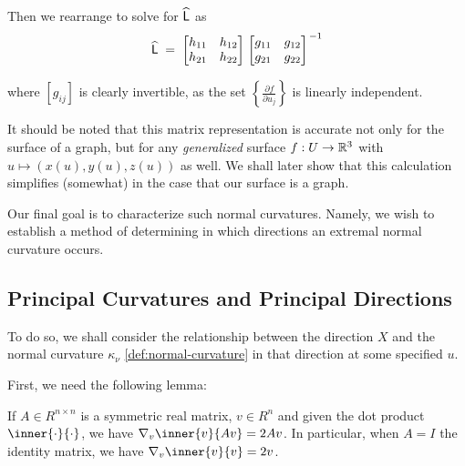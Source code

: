 	Then we rearrange to solve for $\widehat{\mathsf{L}}$ as
		\begin{equation} \label{weinmatconstruction}
		\widehat{\mathsf{L}}
		\;=\; \begin{bmatrix} h_{11} & h_{12} \\ h_{21} & h_{22} \end{bmatrix}
		\left.\begin{bmatrix} g_{11} & g_{12} \\ g_{21} & g_{22} \end{bmatrix}\right.^{-1}
		\end{equation}
	
	where $\left[ g_{ij} \right]$ is clearly invertible, as the set
	$\left\{\frac{\partial f}{\partial u_j}\right\}$ is linearly independent.
	
	It should be noted that this matrix representation is accurate not only for the surface of a graph, but for any \textit{generalized} surface
	$f: U \to \mathbb{R}^3 $ with $u \mapsto (x(u), y(u), z(u))$ as well. We shall later show that this calculation simplifies (somewhat) in the case that our surface is a graph.
	
	Our final goal is to characterize such normal curvatures.
	Namely, we wish to establish a method of determining in which directions an extremal normal curvature occurs.
	
	
	\subsection{Principal Curvatures and Principal Directions}
	To do so, we shall consider the relationship between the direction $X$ and the normal curvature $\kappa_\nu$ \cref{def:normal-curvature} in that direction at some specified $u$.


	
	First, we need the following lemma:
    \begin{lemma}
        If $A\in R^{n\times n}$ is a symmetric real matrix, $v \in R^n$
        and given the dot product $\inner{\cdot}{\cdot}$,
        we have $\nabla_{v} \inner{v}{Av} = 2Av$.
        In particular, when $A = I$ the identity matrix, we have
        $ \nabla_{v} \inner{v}{v} = 2v$.
    \end{lemma}
    
